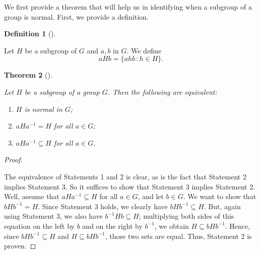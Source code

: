 \documentclass[10pt,]{book}
\theoremstyle{plain}
\newtheorem{theorem}{Theorem}[section]
\theoremstyle{definition}
\newtheorem{definition}[theorem]{Definition}
\theoremstyle{definition}
\theoremstyle{definition}
\theoremstyle{definition}
\numberwithin{equation}{section}
\begin{document}
    We first provide a theorem that will help us in identifying when a
    subgroup of a group is normal. First, we provide a definition.
\begin{definition}[{}]\label{definition-64}

        Let \(H\) be a subgroup of \(G\) and \(a,b\) in \(G\). We define
\begin{equation*}

          aHb=\{ahb\,:h\in H\}.
        
\end{equation*}

\label{notation-72}
\end{definition}
\begin{theorem}[{}]\label{norm_thm}

        Let \(H\) be a subgroup of a group \(G\). Then the
        following are equivalent:
        \leavevmode%
\begin{enumerate}
\item\hypertarget{li-485}{}
              \(H\) is normal in \(G\);
\item\hypertarget{li-486}{}
              \(aHa^{-1}=H\) for all \(a\in G\);
\item\hypertarget{li-487}{}
              \(aHa^{-1}\subseteq H\) for all \(a\in G\).
\end{enumerate}

\end{theorem}
\begin{proof}\hypertarget{proof-42}{}

      The equivalence of Statements 1 and 2 is clear, as is the
      fact that Statement 2 implies Statement 3. So it suffices to show
      that Statement 3 implies Statement 2. Well, assume that
      \(aHa^{-1}\subseteq H\) for all \(a\in G\), and let \(b\in G\). We want
      to show that \(bHb^{-1}=H\). Since Statement 3 holds, we clearly have
      \(bHb^{-1}\subseteq H\). But, again using Statement 3, we also have
      \(b^{-1}Hb\subseteq H\); multiplying both sides of this equation on
      the left by \(b\) and on the right by \(b^{-1}\), we obtain \(H\subseteq
      bHb^{-1}\). Hence, since \(bHb^{-1}\subseteq H\) and \(H\subseteq
      bHb^{-1}\), those two sets are equal. Thus, Statement 2 is proven.
\end{proof}
\par
\end{document}
